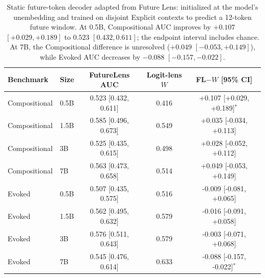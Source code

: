 \begin{table}[h]
\centering
\caption{Static future-token decoder adapted from Future Lens:
initialized at the model's unembedding and trained on disjoint Explicit
contexts to predict a 12-token future window. At 0.5B, Compositional AUC
improves by $+0.107$ $[+0.029,+0.189]$ to $0.523$ $[0.432,0.611]$;
the endpoint interval includes chance. At 7B, the Compositional difference
is unresolved ($+0.049$ $[-0.053,+0.149]$), while Evoked AUC decreases
by $-0.088$ $[-0.157,-0.022]$.}
\label{tab:appA6}
\small
\begin{tabular}{llccc}
\toprule
Benchmark & Size & FutureLens AUC & Logit-lens $W$ & FL$-W$ [95\% CI] \\
\midrule
Compositional & 0.5B & 0.523 [0.432, 0.611] & 0.416 & \textcolor{gain}{+0.107} [+0.029, +0.189]$^{*}$ \\
Compositional & 1.5B & 0.585 [0.496, 0.673] & 0.549 & +0.035 [-0.034, +0.113] \\
Compositional & 3B & 0.525 [0.435, 0.615] & 0.498 & +0.028 [-0.052, +0.112] \\
Compositional & 7B & 0.563 [0.473, 0.658] & 0.514 & +0.049 [-0.053, +0.149] \\
Evoked & 0.5B & 0.507 [0.435, 0.575] & 0.516 & -0.009 [-0.081, +0.065] \\
Evoked & 1.5B & 0.562 [0.495, 0.632] & 0.579 & -0.016 [-0.091, +0.058] \\
Evoked & 3B & 0.576 [0.511, 0.643] & 0.579 & -0.003 [-0.071, +0.068] \\
Evoked & 7B & 0.545 [0.476, 0.614] & 0.633 & \textcolor{loss}{-0.088} [-0.157, -0.022]$^{*}$ \\
\bottomrule
\end{tabular}
\end{table}
